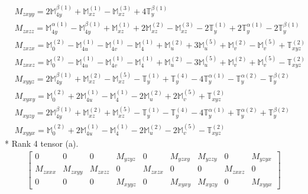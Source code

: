 \documentclass[fleqn,8pt,landscape]{jsarticle}
\begin{document}
\begin{align*}
& M_{zxyy} = 2 \mathbb{M}_{4y}^{\beta(1)} + \mathbb{M}_{xz}^{(1)} - \mathbb{M}_{xz}^{(3)} + 4 \mathbb{T}_{y}^{\beta(1)} \\
& M_{zxzz} = \mathbb{M}_{4y}^{\alpha(1)} - \mathbb{M}_{4y}^{\beta(1)} + \mathbb{M}_{xz}^{(1)} + 2 \mathbb{M}_{xz}^{(2)} - \mathbb{M}_{xz}^{(3)} - 2 \mathbb{T}_{y}^{(1)} + 2 \mathbb{T}_{y}^{\alpha(1)} - 2 \mathbb{T}_{y}^{\beta(1)} \\
& M_{zxzx} = \mathbb{M}_{0}^{(2)} - \mathbb{M}_{4u}^{(1)} - \mathbb{M}_{4v}^{(1)} - \mathbb{M}_{4}^{(1)} + \mathbb{M}_{u}^{(2)} + 3 \mathbb{M}_{u}^{(5)} + \mathbb{M}_{v}^{(2)} - \mathbb{M}_{v}^{(5)} + \mathbb{T}_{xyz}^{(2)} \\
& M_{zxxz} = \mathbb{M}_{0}^{(2)} - \mathbb{M}_{4u}^{(1)} - \mathbb{M}_{4v}^{(1)} - \mathbb{M}_{4}^{(1)} + \mathbb{M}_{u}^{(2)} - 3 \mathbb{M}_{u}^{(5)} + \mathbb{M}_{v}^{(2)} + \mathbb{M}_{v}^{(5)} - \mathbb{T}_{xyz}^{(2)} \\
& M_{xyyz} = 2 \mathbb{M}_{4y}^{\beta(1)} + \mathbb{M}_{xz}^{(2)} - \mathbb{M}_{xz}^{(5)} - \mathbb{T}_{y}^{(1)} + \mathbb{T}_{y}^{(4)} - 4 \mathbb{T}_{y}^{\alpha(1)} - \mathbb{T}_{y}^{\alpha(2)} - \mathbb{T}_{y}^{\beta(2)} \\
& M_{xyxy} = \mathbb{M}_{0}^{(2)} + 2 \mathbb{M}_{4u}^{(1)} - \mathbb{M}_{4}^{(1)} - 2 \mathbb{M}_{u}^{(2)} + 2 \mathbb{M}_{v}^{(5)} + \mathbb{T}_{xyz}^{(2)} \\
& M_{xyzy} = 2 \mathbb{M}_{4y}^{\beta(1)} + \mathbb{M}_{xz}^{(2)} + \mathbb{M}_{xz}^{(5)} - \mathbb{T}_{y}^{(1)} - \mathbb{T}_{y}^{(4)} - 4 \mathbb{T}_{y}^{\alpha(1)} + \mathbb{T}_{y}^{\alpha(2)} + \mathbb{T}_{y}^{\beta(2)} \\
& M_{xyyx} = \mathbb{M}_{0}^{(2)} + 2 \mathbb{M}_{4u}^{(1)} - \mathbb{M}_{4}^{(1)} - 2 \mathbb{M}_{u}^{(2)} - 2 \mathbb{M}_{v}^{(5)} - \mathbb{T}_{xyz}^{(2)}
\end{align*}
* Rank 4 tensor (a).
\begin{align*}
\begin{bmatrix} 0 & 0 & 0 & M_{yzyz} & 0 & M_{yzxy} & M_{yzzy} & 0 & M_{yzyx} \\ M_{zxxx} & M_{zxyy} & M_{zxzz} & 0 & M_{zxzx} & 0 & 0 & M_{zxxz} & 0 \\ 0 & 0 & 0 & M_{xyyz} & 0 & M_{xyxy} & M_{xyzy} & 0 & M_{xyyx} \end{bmatrix}
\end{align*}
\end{document}
